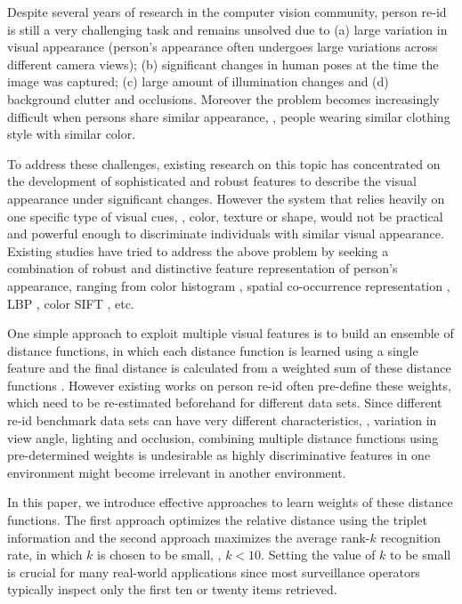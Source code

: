 \documentclass[10pt,twocolumn,letterpaper]{article}
\makeatletter
\renewcommand{\etc}{etc.}
\def\etc{etc.\@\xspace}
\makeatother
\begin{document}
Despite several years of research in the computer vision community,
person re-id is still a very challenging task and
remains unsolved due to (a) large variation in visual appearance
(person's appearance often undergoes large variations
across different camera views);
(b) significant changes in human poses
at the time the image was captured;
(c) large amount of illumination changes and
(d) background clutter and occlusions.
Moreover the problem becomes increasingly difficult when
persons share similar appearance, \eg,
people wearing similar
clothing style with similar color.
%
%
%




To address these challenges, existing research
on this topic
has concentrated on the development
of sophisticated and robust features to describe the visual appearance
under significant changes.
However the system that relies heavily on one specific type
of visual cues, \eg, color, texture or shape,
would not be practical and powerful enough to discriminate individuals with
similar visual appearance.
Existing studies have tried to address the above problem
by seeking a combination of robust and distinctive feature
representation of person's appearance,
ranging from color histogram \cite{Gray2008Viewpoint},
spatial co-occurrence representation \cite{Wang2007Shape},
LBP \cite{Xiong2014Person},
color SIFT \cite{Zhao2013Unsupervised}, \etc


One simple approach to exploit multiple visual features
is to build an ensemble of distance functions,
in which each distance function is learned using
a single feature
and the final distance is calculated from a weighted
sum of these distance functions
\cite{Farenzena2010Person,Xiong2014Person,Zhao2013Unsupervised}.
However existing works on person re-id often pre-define
these weights,
which need to be re-estimated
beforehand for different data sets.
Since different re-id benchmark data sets can have very different
characteristics, \ie, variation in view angle, lighting and occlusion,
combining multiple distance functions using pre-determined
weights is undesirable as highly discriminative features in one environment
might become irrelevant in another environment.


In this paper, we introduce effective approaches
to learn weights of these distance functions.
The first approach optimizes the relative distance using the triplet information
and the second approach maximizes the average
rank-$k$ recognition rate, in which $k$ is chosen to be small,
\eg, $k < 10$.
Setting the value of $k$ to be small is
crucial for many real-world applications since most surveillance
operators typically inspect only the first ten or twenty items retrieved.
\end{document}
